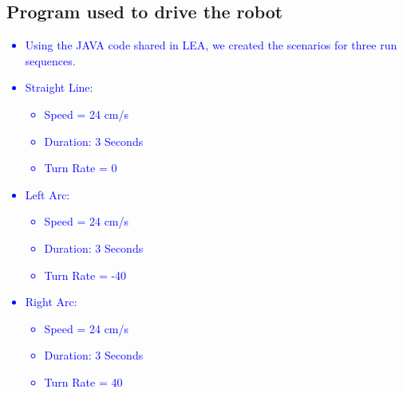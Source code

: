 \documentclass[10pt,a4paper]{article}
\begin{document}
			\subsection{Program used to drive the robot}\textcolor{blue}{
				\begin{itemize}
					\item Using the JAVA code shared in LEA, we created the scenarios for three run sequences.
					\item Straight Line:
						\begin{itemize}
							\item Speed = 24 cm/s
							\item Duration: 3 Seconds
							\item Turn Rate = 0
						\end{itemize}
					\item Left Arc:
						\begin{itemize}
							\item Speed = 24 cm/s
							\item Duration: 3 Seconds
							\item Turn Rate = -40
						\end{itemize}
					\item Right Arc:
						\begin{itemize}
							\item Speed = 24 cm/s
							\item Duration: 3 Seconds
							\item Turn Rate = 40
						\end{itemize}							
				\end{itemize}
			}
\end{document}
